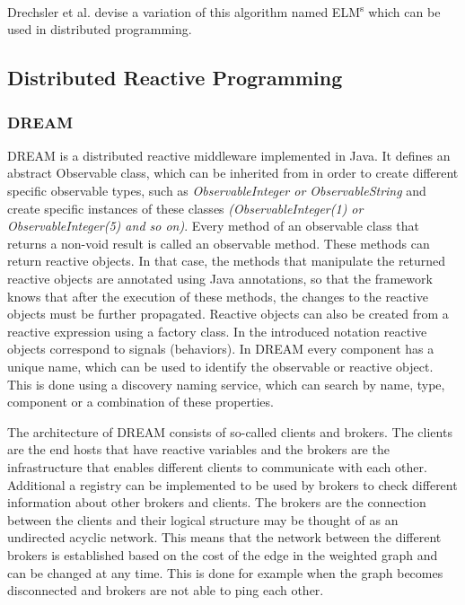 \documentclass{sigplanconf}
\begin{document}
Drechsler et al. \cite{sidup} devise a variation of this algorithm named ELM\textsuperscript{s} which can be used in distributed programming.

\subsection{Distributed Reactive Programming}

\subsubsection{DREAM}
DREAM \cite{dream} is a distributed reactive middleware implemented in Java. It defines an abstract Observable class, which can be inherited from in order to create different specific observable types, such as \textit{ObservableInteger or ObservableString} and create specific instances of these classes \textit{(ObservableInteger(1) or ObservableInteger(5) and so on)}. Every method of an observable class that returns a non-void result is called an observable method. These methods can return reactive objects. In that case, the methods that manipulate the returned reactive objects are annotated using Java annotations, so that the framework knows that after the execution of these methods, the changes to the reactive objects must be further propagated. 
Reactive objects can also be created from a reactive expression using a factory class. In the introduced notation reactive objects correspond to signals (behaviors).
In DREAM every component has a unique name, which can be used to identify the observable or reactive object. This is done using a discovery naming service, which can search by name, type, component or a combination of these properties.

The architecture of DREAM consists of so-called clients and brokers. The clients are the end hosts that have reactive variables and the brokers are the infrastructure that enables different clients to communicate with each other. Additional a registry can be implemented to be used by brokers to check different information about other brokers and clients. The brokers are the connection between the clients and their logical structure may be thought of as an undirected acyclic network. This means that the network between the different brokers is established based on the cost of the edge in the weighted graph and can be changed at any time. This is done for example when the graph becomes disconnected and brokers are not able to ping each other.
\end{document}
